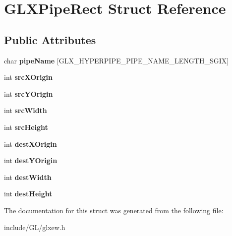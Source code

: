 \hypertarget{structGLXPipeRect}{}\section{G\+L\+X\+Pipe\+Rect Struct Reference}
\label{structGLXPipeRect}
\subsection*{Public Attributes}
\begin{DoxyCompactItemize}
\item 
\mbox{\label{structGLXPipeRect_aa4c4f60e9647705ddefa10f95a37cb79}} 
char {\bfseries pipe\+Name} \mbox{[}G\+L\+X\+\_\+\+H\+Y\+P\+E\+R\+P\+I\+P\+E\+\_\+\+P\+I\+P\+E\+\_\+\+N\+A\+M\+E\+\_\+\+L\+E\+N\+G\+T\+H\+\_\+\+S\+G\+IX\mbox{]}
\item 
\mbox{\label{structGLXPipeRect_a9df2313c01f75d149e64f2ff467bc266}} 
int {\bfseries src\+X\+Origin}
\item 
\mbox{\label{structGLXPipeRect_a1f7316dff7050ab2ce9d3d37f8c5450e}} 
int {\bfseries src\+Y\+Origin}
\item 
\mbox{\label{structGLXPipeRect_a2c6c180a4dabb71076366e06a1c7d0ef}} 
int {\bfseries src\+Width}
\item 
\mbox{\label{structGLXPipeRect_a35632524bce6bffa05f284a9b1c1b8ff}} 
int {\bfseries src\+Height}
\item 
\mbox{\label{structGLXPipeRect_a8b7b941894ad3420326d7e9fa885bb71}} 
int {\bfseries dest\+X\+Origin}
\item 
\mbox{\label{structGLXPipeRect_aef7766b02ef07c20a11e89da5878b469}} 
int {\bfseries dest\+Y\+Origin}
\item 
\mbox{\label{structGLXPipeRect_a3c07991d2a8fb6e973eae834650b3dad}} 
int {\bfseries dest\+Width}
\item 
\mbox{\label{structGLXPipeRect_a858b0ea6642e451495aff35cfefbd083}} 
int {\bfseries dest\+Height}
\end{DoxyCompactItemize}


The documentation for this struct was generated from the following file\+:\begin{DoxyCompactItemize}
\item 
include/\+G\+L/glxew.\+h\end{DoxyCompactItemize}
